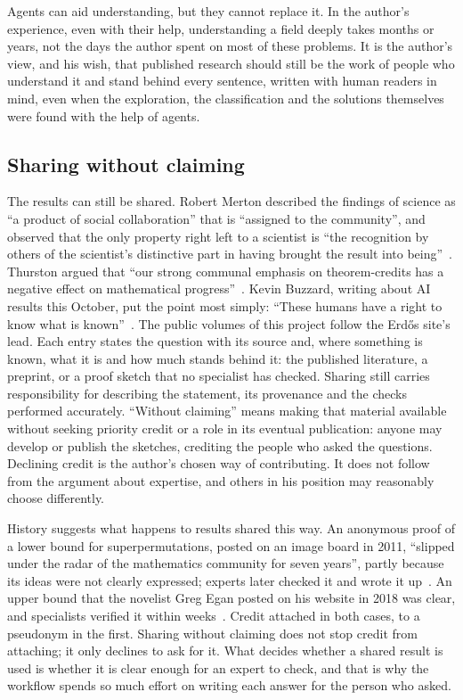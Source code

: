 \documentclass[11pt]{amsart}
\begin{document}
Agents can aid understanding, but they cannot replace it. In the author's
experience, even with their help, understanding a field deeply takes months or
years, not the days the author spent on most of these problems. It is the
author's view, and his wish, that published research should still be the work
of people who understand it and stand behind every sentence, written with human
readers in mind, even when the exploration, the classification and the
solutions themselves were found with the help of agents.

\subsection*{Sharing without claiming}
The results can still be shared. Robert Merton described the findings of
science as ``a product of social collaboration'' that is ``assigned to the
community'', and observed that the only property right left to a scientist is
``the recognition by others of the scientist's distinctive part in having
brought the result into being''~\cite{merton1957}. Thurston argued that ``our
strong communal emphasis on theorem-credits has a negative effect on
mathematical progress''~\cite{thurston}. Kevin Buzzard, writing about AI
results this October, put the point most simply: ``These humans have a right to
know what is known''~\cite{buzzard-grieve}. The public volumes of this project
follow the Erdős site's lead. Each entry states the question with its source
and, where something is known, what it is and how much stands behind it: the
published literature, a preprint, or a proof sketch that no specialist has
checked. Sharing still carries responsibility for describing the statement, its
provenance and the checks performed accurately. ``Without claiming'' means
making that material available without seeking priority credit or a role in its
eventual publication: anyone may develop or publish the sketches, crediting the
people who asked the questions. Declining credit is the author's chosen way of
contributing. It does not follow from the argument about expertise, and others
in his position may reasonably choose differently.

History suggests what happens to results shared this way. An anonymous proof of
a lower bound for superpermutations, posted on an image board in 2011,
``slipped under the radar of the mathematics community for seven years'',
partly because its ideas were not clearly expressed; experts later checked it
and wrote it up~\cite{quanta-superperm}. An upper bound that the novelist Greg
Egan posted on his website in 2018 was clear, and specialists verified it
within weeks~\cite{quanta-superperm}. Credit attached in both cases, to a
pseudonym in the first. Sharing without claiming does not stop credit from
attaching; it only declines to ask for it. What decides whether a shared result
is used is whether it is clear enough for an expert to check, and that is why
the workflow spends so much effort on writing each answer for the person who
asked.
\end{document}
